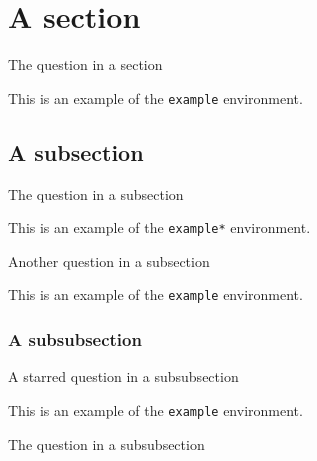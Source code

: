 \documentclass{article}
\newcounter{question}
\newcounter{example}
\begin{document}
    \ttsetup{
    }

    \section{A section}

    \begin{question}
    The question in a section
    \end{question}

    \begin{example}
        This is an example of the \texttt{example} environment.
    \end{example}

    \subsection{A subsection}

    \begin{question}
    The question in a subsection
    \end{question}

    \begin{example*}
        This is an example of the \texttt{example*} environment.
    \end{example*}

    \begin{question}
    Another question in a subsection
    \end{question}

    \begin{example}
        This is an example of the \texttt{example} environment.
    \end{example}

    \subsubsection{A subsubsection}

    \begin{question*}
    A starred question in a subsubsection
    \end{question*}

    \begin{example}
        This is an example of the \texttt{example} environment.
    \end{example}


    \begin{question}
    The question in a subsubsection
    \end{question}
\end{document}
